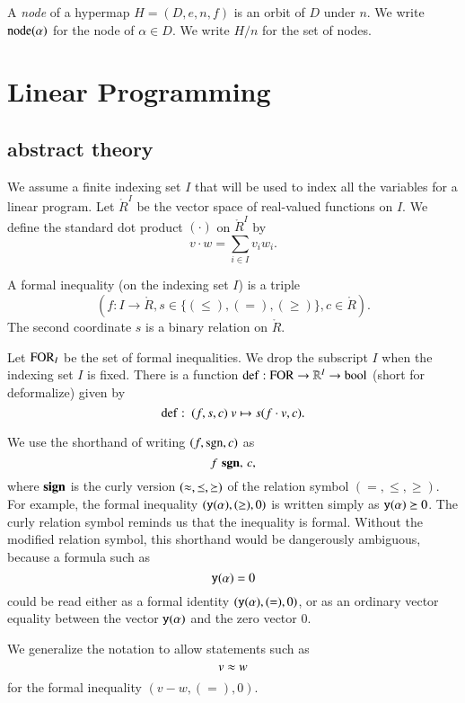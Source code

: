 \begin{definition}[node,~$H/n$]  A {\it node} of a hypermap $H=(D,e,n,f)$ is an orbit of $D$
under $n$.  We write ${\operatorname{node}}(\alpha)$ for the node of
$\alpha\in D$.  We write $H/n$ for the set of nodes.
\end{definition}


\section{Linear Programming}



\subsection{abstract theory}

We assume a finite indexing set $I$ that will be used  to index
all the variables for a linear program. Let $\ring{R}^I$ be the
vector space of real-valued functions on $I$. We define the
standard dot product $(\cdot)$ on $\ring{R}^I$ by
    $$v\cdot w = \sum_{i\in I} v_i w_i.$$

\begin{definition}
A formal inequality (on the indexing set $I$) is a triple
    $$(f:I\to\ring{R},s\in\{(\le),(=),(\ge)\},c\in\ring{R}).$$
The second coordinate $s$ is a binary relation on $\ring{R}$.
\end{definition}

Let ${\operatorname{FOR}}_I$ be the set of formal inequalities.  We drop the
subscript $I$ when the indexing set $I$ is fixed.  There is a
function ${\operatorname{def}}:{\operatorname{FOR}}\to \mathbb{R}^I \to \operatorname{bool}$ (short for
deformalize) given by
    $$\op{def}:\ (f,s,c)\ v \mapsto s(f\cdot v,c).$$

\begin{remark}
We use the shorthand of writing $(f,{\operatorname{sgn}},c)$ as
   $$f\,\,{\operatorname{{\bf sgn}}},\, c,$$
where ${\operatorname{{\bf sign}}}$ is the curly version $(\approx,\preceq,\succeq)$ of
the relation symbol $(=,\le,\ge)$. For example, the formal
inequality
    $({\operatorname{{\texttt{y}}}}(\alpha),(\ge),0)$ is written simply as ${\operatorname{{\texttt{y}}}}(\alpha)\succeq 0$.
The curly relation symbol reminds us that the inequality is
formal.  Without the modified relation symbol, this shorthand
would be dangerously ambiguous, because a formula such as
    $${\operatorname{{\texttt{y}}}}(\alpha) = 0$$
could be read either as a formal identity
$({\operatorname{{\texttt{y}}}}(\alpha),(=),0)$, or as an ordinary vector equality
between the vector ${\operatorname{{\texttt{y}}}}(\alpha)$ and the zero vector $0$.

We generalize the notation to allow statements such as
    $$v \approx w$$
for the formal inequality $(v-w,(=),0)$.
\end{remark}

